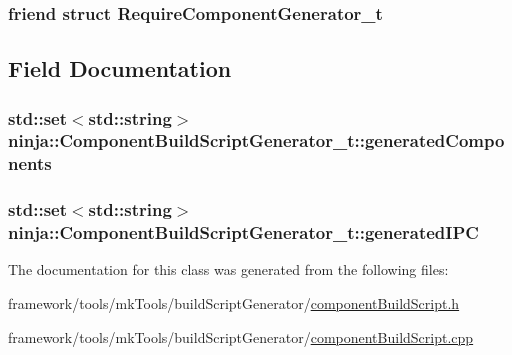 \subsubsection[{\texorpdfstring{Require\+Component\+Generator\+\_\+t}{RequireComponentGenerator_t}}]{\setlength{\rightskip}{0pt plus 5cm}friend struct {\bf Require\+Component\+Generator\+\_\+t}\hspace{0.3cm}{\ttfamily [friend]}}\hypertarget{classninja_1_1_component_build_script_generator__t_aac209b147ecd6cb83eb8c87f5020f5a7}{}\label{classninja_1_1_component_build_script_generator__t_aac209b147ecd6cb83eb8c87f5020f5a7}


\subsection{Field Documentation}
\subsubsection[{\texorpdfstring{generated\+Components}{generatedComponents}}]{\setlength{\rightskip}{0pt plus 5cm}std\+::set$<$std\+::string$>$ ninja\+::\+Component\+Build\+Script\+Generator\+\_\+t\+::generated\+Components\hspace{0.3cm}{\ttfamily [protected]}}\hypertarget{classninja_1_1_component_build_script_generator__t_aea155e85d71b9734a017712dbb5f3942}{}\label{classninja_1_1_component_build_script_generator__t_aea155e85d71b9734a017712dbb5f3942}
\subsubsection[{\texorpdfstring{generated\+I\+PC}{generatedIPC}}]{\setlength{\rightskip}{0pt plus 5cm}std\+::set$<$std\+::string$>$ ninja\+::\+Component\+Build\+Script\+Generator\+\_\+t\+::generated\+I\+PC\hspace{0.3cm}{\ttfamily [protected]}}\hypertarget{classninja_1_1_component_build_script_generator__t_a98ae4bbd7b3285dd51073a901971a4be}{}\label{classninja_1_1_component_build_script_generator__t_a98ae4bbd7b3285dd51073a901971a4be}


The documentation for this class was generated from the following files\+:\begin{DoxyCompactItemize}
\item 
framework/tools/mk\+Tools/build\+Script\+Generator/\hyperlink{component_build_script_8h}{component\+Build\+Script.\+h}\item 
framework/tools/mk\+Tools/build\+Script\+Generator/\hyperlink{component_build_script_8cpp}{component\+Build\+Script.\+cpp}\end{DoxyCompactItemize}
